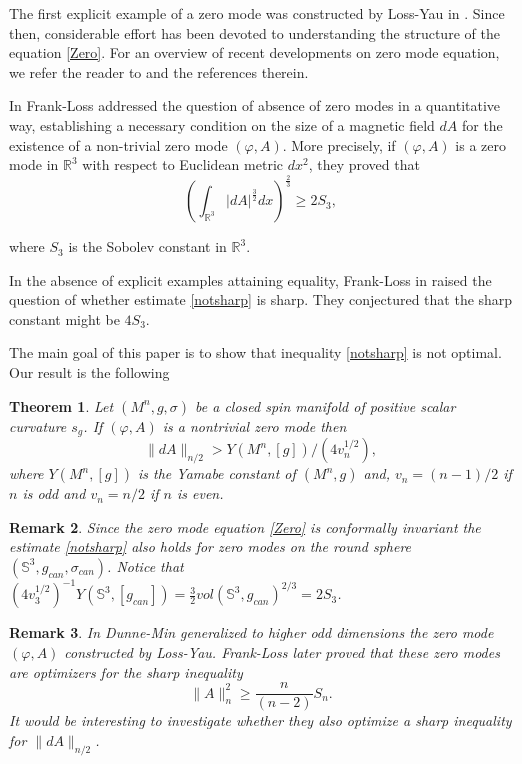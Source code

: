 \documentclass[11pt]{amsart}
\newtheorem{theorem}{Theorem}[section]
\theoremstyle{plain}
\newtheorem{remark}[theorem]{Remark}
\numberwithin{equation}{section}
\theoremstyle{plain}
\begin{document}
The first explicit example of a zero mode was constructed  by Loss-Yau in \cite{Loss-Yau}. Since then, considerable effort has been devoted to understanding the structure of the equation \eqref{Zero}. For an overview of recent developments on zero mode equation, we refer the reader to   \cite{Frank} and the references therein.

In \cite{Frank} Frank-Loss addressed the question of absence of zero modes in a quantitative way, establishing a necessary condition on the size of a magnetic field $dA$ for the existence of a non-trivial zero mode $(\varphi,A)$. More precisely, if $(\varphi,A)$ is a zero mode in $\mathbb{R}^3$ with respect to Euclidean metric $dx^2$, they proved that 
\begin{equation}\label{notsharp}
\left(\int_{\mathbb{R}^3}|dA|^{\frac{3}{2}}dx\right)^{\frac{2}{3}}\geq 2S_3 ,
\end{equation}

where $S_3$ is the Sobolev constant in $\mathbb{R}^3$.

In the absence of explicit examples attaining equality, Frank-Loss in \cite{Frank}  raised the question of whether estimate \eqref{notsharp} is sharp. They conjectured that the sharp constant might be $4S_3$.

The main goal of this paper is to show that inequality \eqref{notsharp} is not optimal. Our result is the following

\begin{theorem}
Let $(M^n,g,\sigma)$ be a closed spin manifold of positive scalar curvature $s_g$. If $(\varphi,A)$ is a nontrivial zero mode then $$\parallel dA\parallel_{n/2}>Y(M^n,[g])/(4v_n^{1/2}),$$ where $Y(M^n,[g])$ is the Yamabe constant of $(M^n,g)$ and, $v_n=(n-1)/2$ if $n$ is odd and $v_n=n/2$ if $n$ is even.
\end{theorem}

\begin{remark}
Since the zero mode equation \eqref{Zero} is conformally invariant the estimate \eqref{notsharp} also holds for zero modes on the round sphere $(\mathbb{S}^3,g_{can},\sigma_{can})$. Notice that $(4v_3^{1/2})^{-1}Y(\mathbb{S}^3,[g_{can}])=\frac{3}{2}vol(\mathbb{S}^3,g_{can})^{2/3}=2S_3$.
\end{remark}

\begin{remark}
In \cite{Dunne} Dunne-Min generalized to higher odd dimensions the zero mode $(\varphi,A)$ constructed by Loss-Yau. Frank-Loss \cite{Frank-Loss2} later proved that these zero modes are optimizers for the sharp inequality $$\parallel A\parallel_n^2\geq \frac{n}{(n-2)}S_n.$$
It would be interesting to investigate whether they also optimize a sharp inequality for $\parallel dA\parallel_{n/2}$.
\end{remark}
\end{document}
